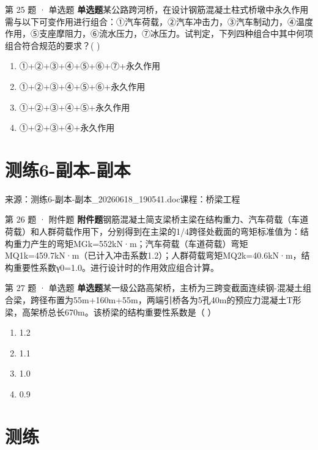 \documentclass[UTF8,zihao=-4,openany]{ctexbook}
\newenvironment{choices}{\begin{enumerate}[label=\Alph*.,leftmargin=9mm,labelsep=3mm,itemsep=2pt,topsep=4pt]}{\end{enumerate}}
\newcommand{\qtype}[1]{\textcolor{brand}{\sffamily\bfseries #1}}
\newcommand{\sourcefile}[1]{\textcolor{muted}{\small\sffamily 来源：#1}}
\begin{document}
\begin{questionbox}{第 25 题 · 单选题}
\qtype{单选题}\quad 某公路跨河桥，在设计钢筋混凝土柱式桥墩中永久作用需与以下可变作用进行组合：①汽车荷载，②汽车冲击力，③汽车制动力，④温度作用，⑤支座摩阻力，⑥流水压力，⑦冰压力。试判定，下列四种组合中其中何项组合符合规范的要求？( )
\begin{choices}
\item ①+②+③+④+⑤+⑥+⑦+永久作用
\item ①+②+③+④+⑤+⑥+永久作用
\item ①+②+③+④+⑤+永久作用
\item ①+②+③+④+永久作用
\end{choices}
\end{questionbox}

\chapter{测练6-副本-副本}

\sourcefile{测练6-副本-副本\_20260618\_190541.doc}\quad \textcolor{muted}{\small\sffamily 课程：桥梁工程}

\begin{questionbox}{第 26 题 · 附件题}
\qtype{附件题}\quad 钢筋混凝土简支梁桥主梁在结构重力、汽车荷载（车道荷载）和人群荷载作用下，分别得到在主梁的1/4跨径处截面的弯矩标准值为：结构重力产生的弯矩MGk=552kN·m；汽车荷载（车道荷载）弯矩MQ1k=459.7kN·m（已计入冲击系数1.2）；人群荷载弯矩MQ2k=40.6kN·m，结构重要性系数γ0=1.0。进行设计时的作用效应组合计算。
\end{questionbox}

\begin{questionbox}{第 27 题 · 单选题}
\qtype{单选题}\quad 某一级公路高架桥，主桥为三跨变截面连续钢-混凝土组合梁，跨径布置为55m+160m+55m，两端引桥各为5孔40m的预应力混凝土T形梁，高架桥总长670m。该桥梁的结构重要性系数是（ ）
\begin{choices}
\item 1.2
\item 1.1
\item 1.0
\item 0.9
\end{choices}
\end{questionbox}

\chapter{测练}
\end{document}
